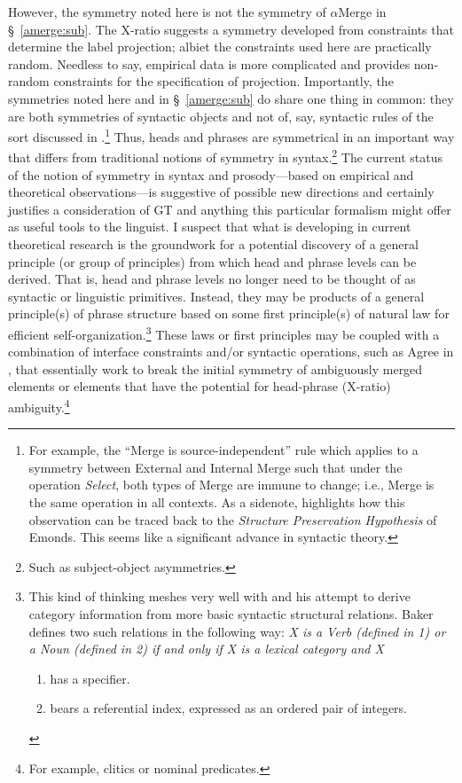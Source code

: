 \documentclass[11pt,twoside]{article}
\begin{document}
However, the symmetry noted here is not the symmetry of $\alpha$Merge in \S~\ref{amerge:sub}. The X-ratio suggests a symmetry developed from constraints that determine the label projection; albiet the constraints used here are practically random. Needless to say, empirical data is more complicated and provides non-random constraints for the specification of projection. Importantly, the symmetries noted here and in \S~\ref{amerge:sub} do share one thing in common: they are both symmetries of syntactic objects and not of, say, syntactic rules of the sort discussed in \cite{boeckx08bare}.\footnote{For example, the ``Merge is source-independent'' rule which applies to a symmetry between External and Internal Merge such that under the operation \textsl{Select}, both types of Merge are immune to change; i.e., Merge is the same operation in all contexts. As a sidenote, \cite{boeckx08bare} highlights how this observation can be traced back to the \textsl{Structure Preservation Hypothesis} of Emonds. This seems like a significant advance in syntactic theory.} Thus, heads and phrases are symmetrical in an important way that differs from traditional notions of symmetry in syntax.\footnote{Such as subject-object asymmetries.} The current status of the notion of symmetry in syntax and prosody---based on empirical and theoretical observations---is suggestive of possible new directions and certainly justifies a consideration of GT and anything this particular formalism might offer as useful tools to the linguist. I suspect that what is developing in  current theoretical research is the groundwork for a potential discovery of a general principle (or group of principles) from which head and phrase levels can be derived. That is, head and phrase levels no longer need to be thought of as syntactic or linguistic primitives. Instead, they may be products of a general principle(s) of phrase structure based on some first principle(s) of natural law for efficient self-organization.\footnote{This kind of thinking meshes very well with \cite{baker:2003} and his attempt to derive category information from more basic syntactic structural relations. Baker defines two such relations in the following way: \textsl{X is a Verb (defined in 1) or a Noun (defined in 2) if and only if X is a lexical category and X} \begin{enumerate}\item has a specifier. \item bears a referential index, expressed as an ordered pair of integers.\end{enumerate}} These laws or first principles may be coupled with a combination of interface constraints and/or syntactic operations, such as Agree in \cite{boeckx08bare}, that essentially work to break the initial symmetry of ambiguously merged elements or elements that have the potential for head-phrase (X-ratio) ambiguity.\footnote{For example, clitics or nominal predicates.}
\end{document}
